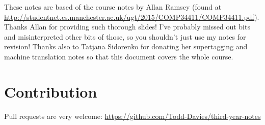 These notes are based of the course notes by Allan Ramsey (found at
\url{http://studentnet.cs.manchester.ac.uk/ugt/2015/COMP34411/COMP34411.pdf}).
Thanks Allan for providing such thorough slides! I've probably missed out bits
and misinterpreted other bits of those, so you shouldn't just use my notes for
revision! Thanks also to Tatjana Sidorenko for donating her supertagging and
machine translation notes so that this document covers the whole course.

\section*{Contribution}

Pull requests are very welcome:
\url{https://github.com/Todd-Davies/third-year-notes}
